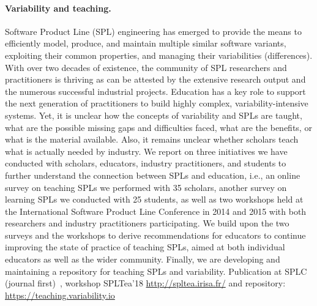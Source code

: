 \paragraph{Variability and teaching.}

Software Product Line (SPL) engineering has emerged to provide the means to efficiently model, produce, and maintain multiple similar software variants, exploiting their common properties, and managing their variabilities (differences). With over two decades of existence, the community of SPL researchers and practitioners is thriving as can be attested by the extensive research output and the numerous successful industrial projects. Education has a key role to support the next generation of practitioners to build highly complex, variability-intensive systems. Yet, it is unclear how the concepts of variability and SPLs are taught, what are the possible missing gaps and difficulties faced, what are the benefits, or what is the material available. Also, it remains unclear whether scholars teach what is actually needed by industry. We report on three initiatives we have conducted with scholars, educators, industry practitioners, and students to further understand the connection between SPLs and education, i.e., an online survey on teaching SPLs we performed with 35 scholars, another survey on learning SPLs we conducted with 25 students, as well as two workshops held at the International Software Product Line Conference in 2014 and 2015 with both researchers and industry practitioners participating. We build upon the two surveys and the workshops to derive recommendations for educators to continue improving the state of practice of teaching SPLs, aimed at both individual educators as well as the wider community. Finally, we are developing and maintaining a repository for teaching SPLs and variability.
Publication at SPLC (journal first)~\cite{acher:hal-01829933}, workshop SPLTea'18 \url{http://spltea.irisa.fr/} and repository: \url{https://teaching.variability.io}


